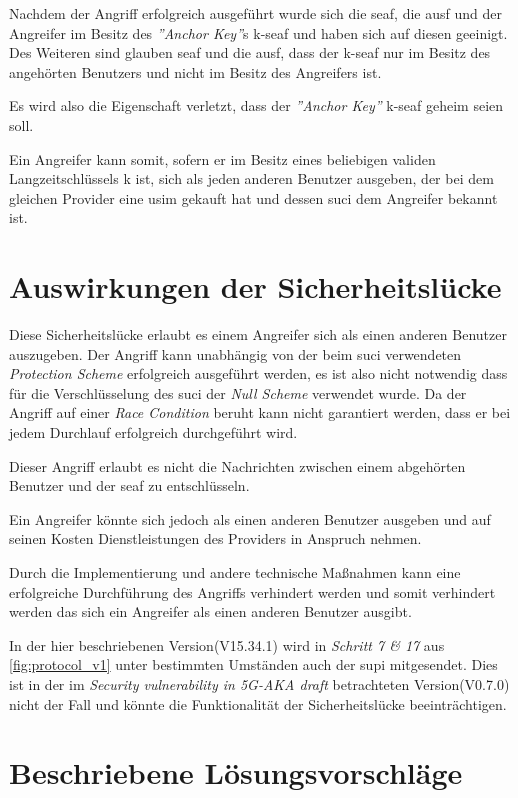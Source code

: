 Nachdem der Angriff erfolgreich ausgeführt wurde sich die \gls{seaf}, die \gls{ausf} und der Angreifer im Besitz des \textit{''Anchor Key''}s \gls{k-seaf} und haben sich auf diesen geeinigt.
Des Weiteren sind glauben \gls{seaf} und die \gls{ausf}, dass der \gls{k-seaf} nur im Besitz des angehörten Benutzers und nicht im Besitz des Angreifers ist.

Es wird also die Eigenschaft verletzt, dass der \textit{''Anchor Key''} \gls{k-seaf} geheim seien soll.

Ein Angreifer kann somit, sofern er im Besitz eines beliebigen validen Langzeitschlüssels \gls{k} ist, sich als jeden anderen Benutzer ausgeben, der bei dem gleichen Provider eine \gls{usim} gekauft hat und dessen \gls{suci} dem Angreifer bekannt ist.


\section{Auswirkungen der Sicherheitslücke}

Diese Sicherheitslücke erlaubt es einem Angreifer sich als einen anderen Benutzer auszugeben.
Der Angriff kann unabhängig von der beim \gls{suci} verwendeten \textit{Protection Scheme} erfolgreich ausgeführt werden, es ist also nicht notwendig dass für die Verschlüsselung des \gls{suci} der \textit{Null Scheme} verwendet wurde.
Da der Angriff auf einer \textit{Race Condition} beruht kann nicht garantiert werden, dass er bei jedem Durchlauf erfolgreich durchgeführt wird.

Dieser Angriff erlaubt es nicht die Nachrichten zwischen einem abgehörten Benutzer und der \gls{seaf} zu entschlüsseln.

Ein Angreifer könnte sich jedoch als einen anderen Benutzer ausgeben und auf seinen Kosten Dienstleistungen des Providers in Anspruch nehmen.

Durch die Implementierung und andere technische Maßnahmen kann eine erfolgreiche Durchführung des Angriffs verhindert werden und somit verhindert werden das sich ein Angreifer als einen anderen Benutzer ausgibt.

In der hier beschriebenen Version(V15.34.1) wird in \textit{Schritt 7 \& 17} aus \cref{fig:protocol_v1} unter bestimmten Umständen auch der \gls{supi} mitgesendet.
Dies ist in der im \textit{Security vulnerability in 5G-AKA draft} betrachteten Version(V0.7.0) nicht der Fall und könnte die Funktionalität der Sicherheitslücke beeinträchtigen.


\section{Beschriebene Lösungsvorschläge}


